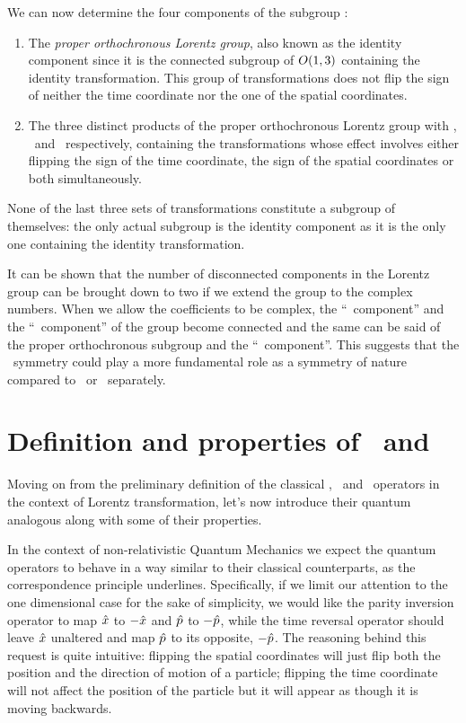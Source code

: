         We can now determine the four components of the subgroup \cite{bender2024}:
        \begin{enumerate}[label = \mybullet]
            \item The \emph{proper orthochronous Lorentz group}, also known as the identity component since it is the connected subgroup of $O\pqty{1,3}$ containing the identity transformation. This group of transformations does not flip the sign of neither the time coordinate nor the one of the spatial coordinates.
            \item The three distinct products of the proper orthochronous Lorentz group with \mcP, \mcT\ and \PT\ respectively, containing the transformations whose effect involves either flipping the sign of the time coordinate, the sign of the spatial coordinates or both simultaneously.
        \end{enumerate}
        None of the last three sets of transformations constitute a subgroup of themselves: the only actual subgroup is the identity component as it is the only one containing the identity transformation.
        
        It can be shown \cite{bender2024} that the number of disconnected components in the Lorentz group can be brought down to two if we extend the group to the complex numbers. When we allow the coefficients to be complex, the ``\mcP\ component'' and the ``\mcT\ component'' of the group become connected and the same can be said of the proper orthochronous subgroup and the ``\PT\ component''. This suggests that the \PT\ symmetry could play a more fundamental role as a symmetry of nature compared to \mcP\ or \mcT\ separately.
    
    \section{Definition and properties of \hP\ and \hT}\label{s:def-of-P-and-T}
        Moving on from the preliminary definition of the classical \mcP, \mcT\ and \PT\ operators in the context of Lorentz transformation, let's now introduce their quantum analogous along with some of their properties.

        In the context of non-relativistic Quantum Mechanics we expect the quantum operators to behave in a way similar to their classical counterparts, as the correspondence principle underlines. Specifically, if we limit our attention to the one dimensional case for the sake of simplicity, we would like the parity inversion operator to map $\hat{x}$ to $-\hat{x}$ and $\hat{p}$ to $-\hat{p}$, while the time reversal operator should leave $\hat{x}$ unaltered and map $\hat{p}$ to its opposite, $-\hat{p}$. The reasoning behind this request is quite intuitive: flipping the spatial coordinates will just flip both the position and the direction of motion of a particle; flipping the time coordinate will not affect the position of the particle but it will appear as though it is moving backwards.

